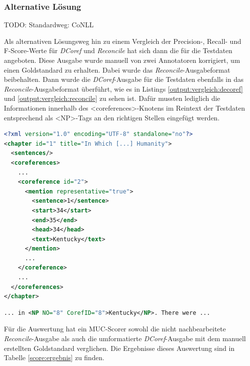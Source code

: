 \documentclass[a4paper,12pt,titlepage=true, ngerman]{scrartcl}
\begin{document}

\subsubsection{Alternative Lösung}%

TODO: Standardweg: CoNLL

Als alternativen Lösungsweg hin zu einem Vergleich der Precision-, Recall- und F-Score-Werte für \emph{DCoref} und \emph{Reconcile} hat sich dann die  für die Testdaten angeboten. Diese Ausgabe wurde manuell von zwei Annotatoren korrigiert, um einen Goldstandard zu erhalten. Dabei wurde das \emph{Reconcile}-Ausgabeformat beibehalten. Dann wurde die \emph{DCoref}-Ausgabe für die Testdaten ebenfalls in das \emph{Reconcile}-Ausgabeformat überführt, wie es in Listings  \ref{output:vergleich:decoref} und \ref{output:vergleich:reconcile} zu sehen ist. Dafür mussten lediglich die Informationen innerhalb des <coreferences>-Knotens im Reintext der Testdaten entsprechend als <NP>-Tags an den richtigen Stellen eingefügt werden.

\begin{lstlisting}[label=output:vergleich:decoref, name=vergleich_decoref.xml, language=xml, caption=Ausschnitt der \emph{DCoref}-Ausgabe für die Testdaten]
<?xml version="1.0" encoding="UTF-8" standalone="no"?>
<chapter id="1" title="In Which [...] Humanity">
  <sentences/>
  <coreferences>
    ...
    <coreference id="2">
      <mention representative="true">
        <sentence>1</sentence>
        <start>34</start>
        <end>35</end>
        <head>34</head>
        <text>Kentucky</text>
      </mention>
      ...
    </coreference>
    ...
  </coreferences>
</chapter>
\end{lstlisting}

\begin{lstlisting}[label=output:vergleich:reconcile, name=vergleich_reconcile.xml, language=xml, caption=Ausschnitt aus Listing \ref{output:vergleich:reconcile} im \emph{Reconcile}-Ausgabeformat]
... in <NP NO="8" CorefID="8">Kentucky</NP>. There were ...
\end{lstlisting}

\noindent Für die Auswertung hat ein MUC-Scorer sowohl die nicht nachbearbeitete \emph{Reconcile}-Ausgabe als auch die umformatierte \emph{DCoref}-Ausgabe mit dem manuell erstellten Goldstandard verglichen. Die Ergebnisse dieses Auswertung sind in Tabelle \ref{score:ergebnis} zu finden.
\end{document}
